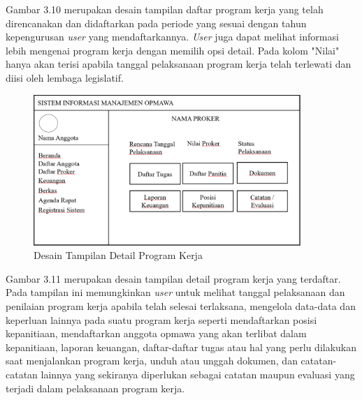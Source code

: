 Gambar 3.10 merupakan desain tampilan daftar program kerja yang telah direncanakan dan didaftarkan pada periode yang sesuai dengan tahun kepengurusan \textit{user} yang mendaftarkannya. \textit{User} juga dapat melihat informasi lebih mengenai program kerja dengan memilih opsi detail. Pada kolom "Nilai" hanya akan terisi apabila tanggal pelaksanaan program kerja telah terlewati dan diisi oleh lembaga legislatif.

\begin{figure}[H]
	\centering
	\includegraphics[width=0.9\textwidth]{gambar/tampilandetailproker}
	\caption{Desain Tampilan Detail Program Kerja}
	\label{Tampilan_detail_proker}
\end{figure}

Gambar 3.11 merupakan desain tampilan detail program kerja yang terdaftar. Pada tampilan ini memungkinkan \textit{user} untuk melihat tanggal pelaksanaan dan penilaian program kerja apabila telah selesai terlaksana, mengelola data-data dan keperluan lainnya pada suatu program kerja seperti mendaftarkan posisi kepanitiaan, mendaftarkan anggota opmawa yang akan terlibat dalam kepanitiaan, laporan keuangan, daftar-daftar tugas atau hal yang perlu dilakukan saat menjalankan program kerja, unduh atau unggah dokumen, dan catatan-catatan lainnya yang sekiranya diperlukan sebagai catatan maupun evaluasi yang terjadi dalam pelaksanaan program kerja.